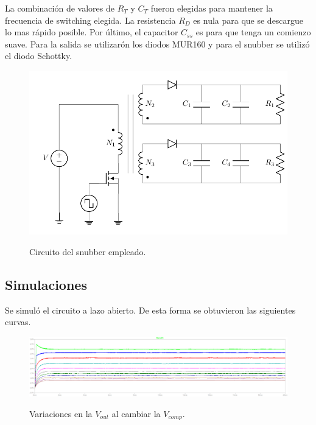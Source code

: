 La combinación de valores de $R_T$ y $C_T$ fueron elegidas para mantener la frecuencia de switching elegida. La resistencia $R_D$ es nula para que se descargue lo mas rápido posible. Por último, el capacitor $C_{ss}$ es para que tenga un comienzo suave.
Para la salida se utilizarón los diodos MUR160 y para el snubber se utilizó el diodo Schottky.  
\begin{figure}[H]
	\centering
	\includegraphics[width=0.7\linewidth, page = 1]{ImagenesParteII/Flyback.pdf}
	\label{fig:fly}
	\caption{Circuito del snubber empleado.}
\end{figure}

\subsection{Simulaciones}

Se simuló el circuito a lazo abierto. De esta forma se obtuvieron las siguientes curvas.
\begin{figure}[H]
	\centering
	\includegraphics[width=0.9\linewidth]{ImagenesParteII/vos.png}
	\label{fig:vos}
	\caption{Variaciones en la $V_{out}$ al cambiar la $V_{comp}$.}
\end{figure}

